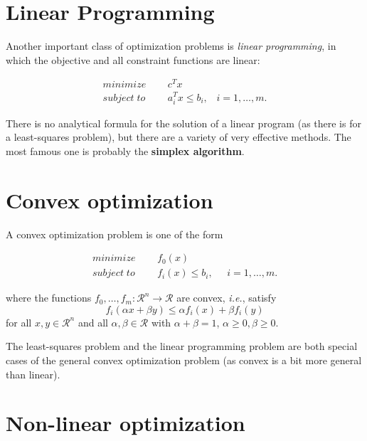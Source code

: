 \section{Linear Programming}

Another important class of optimization problems is \textit{linear programming}, in which the objective and all constraint functions are linear:

\begin{equation}
    \begin{split}
        minimize &\;\;\;\;\; c^Tx \\
        subject\;to & \;\;\;\;\;a_i^Tx\leq b_i,\;\;\;i=1, \dots,m.
    \end{split}
\end{equation}

There is no analytical formula for the solution of a linear program (as there is for a least-squares problem), but there are a variety of very effective methods. The most famous one is probably the \textbf{simplex algorithm}.

\section{Convex optimization}

A convex optimization problem is one of the form

\begin{equation}
    \begin{split}
        minimize &\;\;\;\;\; f_0(x) \\
        subject\;to &\;\;\;\;\; f_i(x) \leq b_i,\;\;\;\;\; i=1, \dots, m.
    \end{split}
\end{equation}

where the functions $f_0, \dots,f_m : \mathcal{R}^n\rightarrow\mathcal{R}$ are convex, \textit{i.e.}, satisfy
\begin{equation}
    f_i(\alpha x+\beta y)\leq \alpha f_i(x)+\beta f_i(y)
\end{equation}
for all $x,y\in\mathcal{R}^n$ and all $\alpha, \beta \in \mathcal{R}$ with $\alpha+\beta=1$, $\alpha\geq0, \beta\geq0$.

The least-squares problem and the linear programming problem are both special cases of the general convex optimization problem (as convex is a bit more general than linear).

\section{Non-linear optimization}


